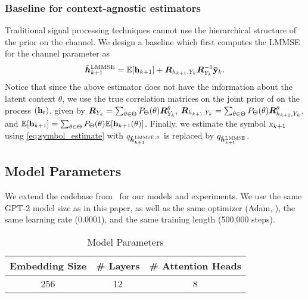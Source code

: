 \documentclass[journal,letterpaper,onecolumn]{IEEEtran}
\begin{document}
\subsubsection{Baseline for context-agnostic estimators}
\label{baseline_for_agnostic_estimators}

Traditional signal processing techniques cannot use the hierarchical structure of the prior on the channel. We design a baseline which first computes the LMMSE for the channel parameter as 
\begin{equation}
\label{eq:context_agnostic_LMMSE_channel}
    \hat{{\bm{h}}}_{k+1}^{\rm LMMSE} = \mathbb{E}[{\mathbf{h}}_{k+1}] + {\bm{R}}_{h_{k+1}, Y_k} {\bm{R}}_{Y_k}^{-1} \bar{{\mathbf{y}}}_k.
\end{equation}
Notice that since the above estimator does not have the information about the latent context $\theta$, we use the true correlation matrices on the joint prior of on the process $({\mathbf{h}}_t)$, given by ${\bm{R}}_{Y_k} = \sum_{\theta\in \Theta} P_\Theta(\theta){\bm{R}}^\theta_{Y_k}$, ${\bm{R}}_{h_{k+1}, Y_k} = \sum_{\theta\in\Theta}P_\Theta(\theta) {\bm{R}}^\theta_{h_{k+1}, Y_k}$, and $\mathbb{E}[{\mathbf{h}}_{k+1}] = \sum_{\theta\in\Theta} P_\Theta(\theta) \mathbb{E}[{\mathbf{h}}_{k+1}(\theta)]$. Finally, we estimate the symbol ${\textnormal{x}}_{k+1}$ using \ref{eq:symbol_estimate} with $q_{\hat{{\bm{h}}}_{k+1}^{\rm LMMSE,\theta}}$ is replaced by $q_{\hat{{\bm{h}}}_{k+1}^{\rm LMMSE}}$.

\subsection{Model Parameters}
\label{parameters}
We extend the codebase from~\cite{ahuja2023incontext} for our models and experiments. We use the same GPT-2 model size as in this paper, as well as the same optimizer (Adam, \cite{Kingma2014AdamAM}), the same learning rate (0.0001), 
and the same training length (500,000 steps).


\begin{table}[ht]
    \centering
    \begin{tabular}{|c|c|c|}
         \hline
         \textbf{Embedding Size} & \textbf{\# Layers} & \textbf{\# Attention Heads} \\
         \hline
         256 & 12 & 8\\
         \hline
    \end{tabular}
    \vspace{2pt}
    \caption{Model Parameters}
    \label{tab:modelparameters}
\end{table}
\end{document}
